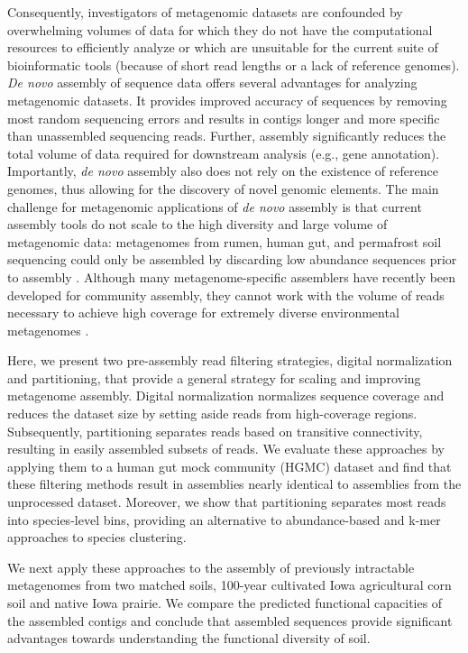 \documentclass{pnastwo}
\begin{document}
\begin{article}
Consequently, investigators of metagenomic datasets are confounded by
overwhelming volumes of data for which they do not have the computational resources
to efficiently analyze or which are unsuitable for the current suite of
bioinformatic tools (because of short read lengths or a lack of reference
genomes). \emph{De novo} assembly of sequence data offers several advantages for
analyzing metagenomic datasets. It provides improved accuracy of sequences by
removing most random sequencing errors and results in contigs longer and more
specific than unassembled sequencing reads. Further, assembly significantly
reduces the total volume of data required for downstream analysis (e.g., gene
annotation). Importantly, \emph{de novo} assembly also does not rely on the
existence of reference genomes, thus allowing for the discovery of novel genomic
elements. The main challenge for metagenomic applications of \emph{de novo}
assembly is that current assembly tools do not scale to the high diversity and
large volume of metagenomic data: metagenomes from rumen, human gut, and
permafrost soil sequencing could only be assembled by discarding low abundance
sequences prior to assembly
\cite{Hess:2011p686,Mackelprang:2011p1087,Qin:2010p189}. Although many
metagenome-specific assemblers have recently been developed for community
assembly, they cannot work with the volume of reads necessary to achieve high
coverage for extremely diverse environmental metagenomes
\cite{metaray, Scholz:2012p1372}.

Here, we present two pre-assembly read filtering strategies, digital
normalization and partitioning, that provide a general strategy for scaling and
improving metagenome assembly. Digital normalization normalizes sequence
coverage and reduces the dataset size by setting aside reads from high-coverage
regions. Subsequently, partitioning separates reads based
on transitive connectivity, resulting in easily assembled subsets of reads. 
We evaluate these approaches by applying them
to a human gut mock community (HGMC) dataset and find that these filtering
methods result in assemblies nearly identical to assemblies from the unprocessed
dataset. Moreover, we show that partitioning separates most reads into
species-level bins, providing an alternative to abundance-based and k-mer
approaches to species clustering.

We next apply these approaches to the assembly of previously intractable
metagenomes from two matched soils, 100-year cultivated Iowa agricultural corn soil
and native Iowa prairie. We compare the predicted functional capacities of the
assembled contigs and conclude that assembled sequences provide significant
advantages towards understanding the functional diversity of soil.


\end{article}
\end{document}
